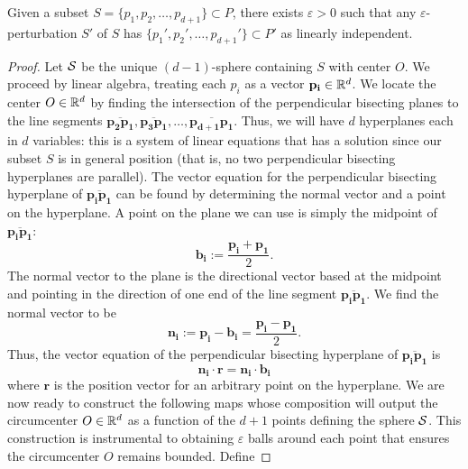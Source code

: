 \documentclass[letterpaper,titlepage]{article}
\begin{document}
    \begin{lem}\label{affine_indep_lemma}
        Given a subset $S= \{p_1,p_2,\dots,p_{d+1}\} \subset P$, there exists $\varepsilon>0$ such that any $\varepsilon$-perturbation $S'$ of $S$ has $\{p_1',p_2',\dots,p_{d+1}'\} \subset P'$ as linearly independent.
    \end{lem}
    \begin{proof}
        Let $\mathcal{S}$ be the unique $(d-1)$-sphere containing $S$ with center $O$. We proceed by linear algebra, treating each $p_i$ as a vector $\mathbf{p_i} \in \mathbb{R}^d$. We locate the center $O \in \mathbb{R}^d$ by finding the intersection of the perpendicular bisecting planes to the line segments $\overline{\mathbf{p_2}\mathbf{p_1}}, \overline{\mathbf{p_3}\mathbf{p_1}}, \dots, \overline{\mathbf{p_{d+1}}\mathbf{p_1}}$.
        Thus, we will have $d$ hyperplanes each in $d$ variables: this is a system of linear equations that has a solution since our subset $S$ is in general position (that is, no two perpendicular bisecting hyperplanes are parallel). The vector equation for the perpendicular bisecting hyperplane of $\overline{\mathbf{p_i}\mathbf{p_1}}$ can be found by determining the normal vector and a point on the hyperplane. A point on the plane we can use is simply the midpoint of $\overline{\mathbf{p_i}\mathbf{p_1}}$:
        $$\mathbf{b_i} := \frac{\mathbf{p_i}+\mathbf{p_1}}{2}.$$
        The normal vector to the plane is the directional vector based at the midpoint and pointing in the direction of one end of the line segment $\overline{\mathbf{p_i}\mathbf{p_1}}$. We find the normal vector to be
        $$\mathbf{n_i} := \mathbf{p_i}-\mathbf{b_i} = \frac{\mathbf{p_i}-\mathbf{p_1}}{2}.$$
        Thus, the vector equation of the perpendicular bisecting hyperplane of $\overline{\mathbf{p_i}\mathbf{p_1}}$ is
        $$\mathbf{n_i}\cdot \mathbf{r}=\mathbf{n_i}\cdot\mathbf{b_i}$$
        where $\mathbf{r}$ is the position vector for an arbitrary point on the hyperplane.
        \newline
        We are now ready to construct the following maps whose composition will output the circumcenter $O \in \mathbb{R}^d$ as a function of the $d+1$ points defining the sphere $\mathcal{S}$. This construction is instrumental to obtaining $\varepsilon$ balls around each point that ensures the circumcenter $O$ remains bounded. Define


\end{proof}
\end{document}
